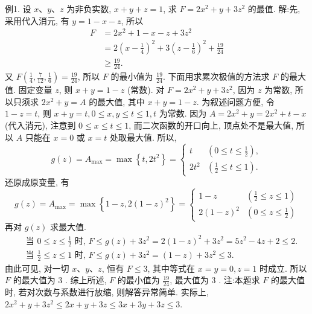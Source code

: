 例1. 设 $x 、 y 、 z$ 为非负实数, $x+y+z=1$, 求 $F=2 x^2+y+3 z^2$ 的最值.
解:先, 采用代入消元, 有 $y=1-x-z$, 所以
$$
\begin{aligned}
F & =2 x^2+1-x-z+3 z^2 \\
& =2\left(x-\frac{1}{4}\right)^2+3\left(z-\frac{1}{6}\right)^2+\frac{19}{24} \\
& \geqslant \frac{19}{24} .
\end{aligned}
$$
又 $F\left(\frac{1}{4}, \frac{7}{12}, \frac{1}{6}\right)=\frac{19}{24}$, 所以 $F$ 的最小值为 $\frac{19}{24}$.
下面用求累次极值的方法求 $F$ 的最大值.
固定变量 $z$, 则 $x+y=1-z$ (常数).
对 $F=2 x^2+y+3 z^2$, 因为 $z$ 为常数, 所以只须求 $2 x^2+y=A$ 的最大值, 其中 $x+y=1-z$. 为叙述问题方便, 令 $1-z=t$, 则 $x+y=t, 0 \leqslant x, y \leqslant t \leqslant 1, t$ 为常数.
因为 $A=2 x^2+y=2 x^2+t-x$ (代入消元), 注意到 $0 \leqslant x \leqslant t \leqslant 1$, 而二次函数的开口向上, 顶点处不是最大值, 所以 $A$ 只能在 $x=0$ 或 $x=t$ 处取最大值.
所以,
$$
g(z)=A_{\max }=\max \left\{t, 2 t^2\right\}= \begin{cases}t & \left(0 \leqslant t \leqslant \frac{1}{2}\right), \\ 2 t^2 & \left(\frac{1}{2} \leqslant t \leqslant 1\right) .\end{cases}
$$
还原成原变量, 有
$$
g(z)=A_{\max }=\max \left\{1-z, 2(1-z)^2\right\}= \begin{cases}1-z & \left(\frac{1}{2} \leqslant z \leqslant 1\right) \\ 2(1-z)^2 & \left(0 \leqslant z \leqslant \frac{1}{2}\right)\end{cases}
$$
再对 $g(z)$ 求最大值.
$$
\begin{aligned}
& \text { 当 } 0 \leqslant z \leqslant \frac{1}{2} \text { 时, } F \leqslant g(z)+3 z^2=2(1-z)^2+3 z^2=5 z^2-4 z+2 \leqslant 2 . \\
& \text { 当 } \frac{1}{2} \leqslant z \leqslant 1 \text { 时, } F \leqslant g(z)+3 z^2=(1-z)+3 z^2 \leqslant 3 .
\end{aligned}
$$
由此可见, 对一切 $x 、 y 、 z$, 恒有 $F \leqslant 3$, 其中等式在 $x=y=0, z=1$ 时成立.
所以 $F$ 的最大值为 3 .
综上所述, $F$ 的最小值为 $\frac{19}{24}$, 最大值为 3 .
注:本题求 $F$ 的最大值时, 若对次数与系数进行放缩, 则解答异常简单.
实际上, $2 x^2+y+3 z^2 \leqslant 2 x+y+3 z \leqslant 3 x+3 y+3 z \leqslant 3$.



